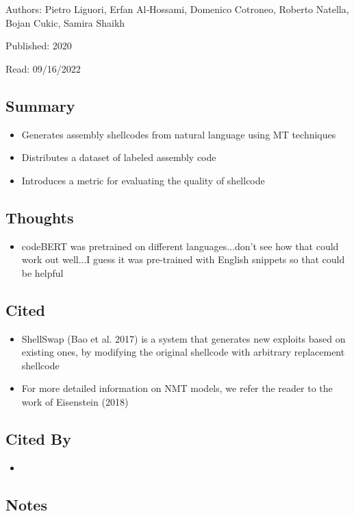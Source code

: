 \documentclass{article}
\begin{document}
\noindent Authors: Pietro Liguori, Erfan Al‑Hossami, Domenico Cotroneo, Roberto Natella, Bojan Cukic, Samira Shaikh

\noindent Published: 2020

\noindent Read: 09/16/2022

\subsection*{Summary}
\begin{itemize}
	\item Generates assembly shellcodes from natural language using MT techniques
	\item Distributes a dataset of labeled assembly code
	\item Introduces a metric for evaluating the quality of shellcode
\end{itemize}

\subsection*{Thoughts}
\begin{itemize}
	\item codeBERT was pretrained on different languages...don't see how that could work out well...I guess it was pre-trained with English snippets so that could be helpful
\end{itemize}

\subsection*{Cited}
\begin{itemize}
	\item ShellSwap (Bao et  al. 2017) is a system that generates new exploits based on existing ones, by modifying the original
	shellcode with arbitrary replacement shellcode
	\item For more detailed information on NMT models, we refer the reader to the work of
	Eisenstein (2018)
\end{itemize}

\subsection*{Cited By}
\begin{itemize}
	\item
\end{itemize}

\subsection*{Notes}
\end{document}
